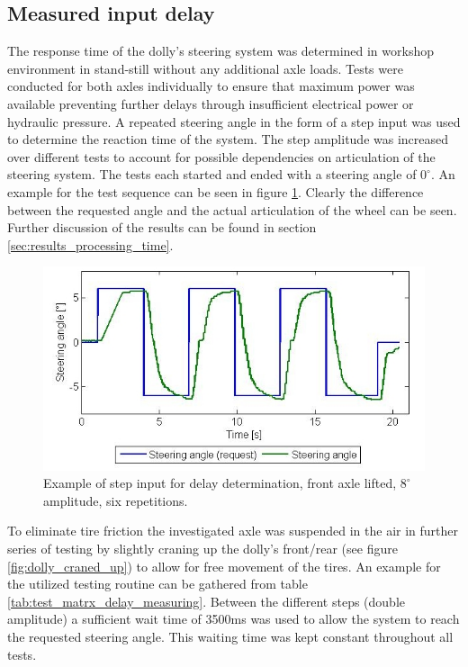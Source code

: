 \documentclass[ExampleMasters.tex]{subfiles}
\begin{document}

\subsection{Measured input delay}
\label{sec:measuring_delay}

The response time of the dolly's steering system was determined in workshop environment in stand-still without any additional axle loads. Tests were conducted for both axles individually to ensure that maximum power was available preventing further delays through insufficient electrical power or hydraulic pressure. A repeated steering angle in the form of a step input was used to determine the reaction time of the system. The step amplitude was increased over different tests to account for possible dependencies on articulation of the steering system. The tests each started and ended with a steering angle of $0^\circ .$ An example for the test sequence can be seen in figure \ref{fig:example_for_step_input_delay_measuring}. Clearly the difference between the requested angle and the actual articulation of the wheel can be seen. Further discussion of the results can be found in section \ref{sec:results_processing_time}.\\

\begin{figure}
\centering
\includegraphics[width=1\linewidth]{figures/example_for_step_input_delay_measuring}
\caption{Example of step input for delay determination, front axle lifted, $8^\circ $ amplitude, six repetitions.}
\label{fig:example_for_step_input_delay_measuring}
\end{figure}


To eliminate tire friction the investigated axle was suspended in the air in further series of testing by slightly craning up the dolly's front/rear (see figure \ref{fig:dolly_craned_up}) to allow for free movement of the tires. An example for the utilized testing routine can be gathered from table \ref{tab:test_matrx_delay_measuring}. Between the different steps (double amplitude) a sufficient wait time of 3500ms was used to allow the system to reach the requested steering angle. This waiting time was kept constant throughout all tests. \\
\end{document}
